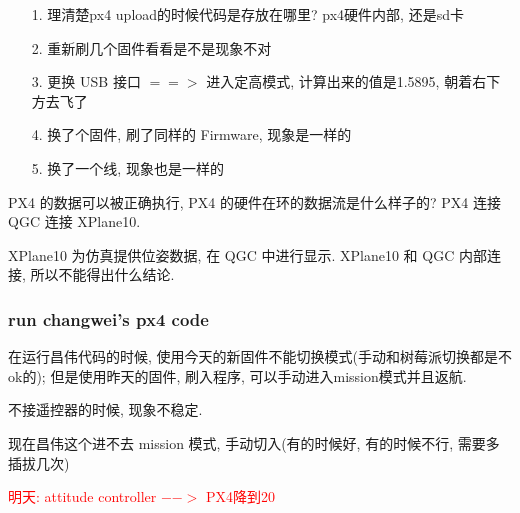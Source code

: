 \begin{itemize}
    \item [1.] 理清楚px4 upload的时候代码是存放在哪里? px4硬件内部, 还是sd卡
    \item [2.] 重新刷几个固件看看是不是现象不对
    \item [3.] 更换 USB 接口 $==>$ 进入定高模式, 计算出来的值是1.5895, 朝着右下方去飞了
    \item [4.] 换了个固件, 刷了同样的 Firmware, 现象是一样的
    \item [5.] 换了一个线, 现象也是一样的
\end{itemize}

PX4 的数据可以被正确执行, PX4 的硬件在环的数据流是什么样子的? PX4 连接 QGC 连接 XPlane10. \par
XPlane10 为仿真提供位姿数据, 在 QGC 中进行显示. XPlane10 和 QGC 内部连接, 所以不能得出什么结论. 

\subsubsection{run changwei's px4 code}
在运行昌伟代码的时候, 使用今天的新固件不能切换模式(手动和树莓派切换都是不ok的); 但是使用昨天的固件, 刷入程序, 可以手动进入mission模式并且返航. \par
不接遥控器的时候, 现象不稳定.

现在昌伟这个进不去 mission 模式, 手动切入(有的时候好, 有的时候不行, 需要多插拔几次)

\par \textcolor{red}{明天: attitude controller $-->$ PX4降到20}